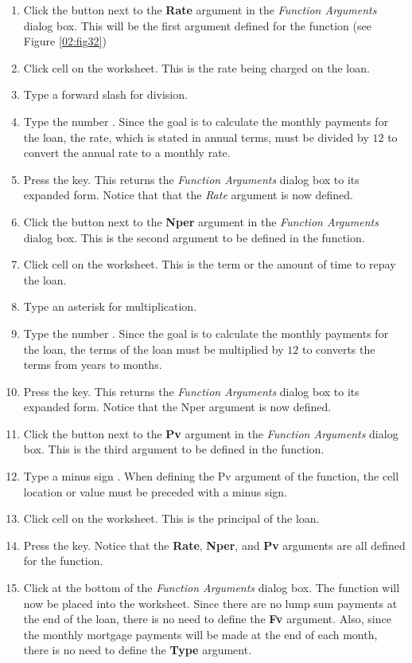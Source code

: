 \begin{enumerate}[resume]
	\item Click the  button next to the \textbf{Rate} argument in the \textit{Function Arguments} dialog box. This will be the first argument defined for the function (see Figure \ref{02:fig32})
	\item Click cell  on the worksheet. This is the rate being charged on the loan.
	\item Type a forward slash \fmtTyping{/} for division.
	\item Type the number . Since the goal is to calculate the monthly payments for the loan, the rate, which is stated in annual terms, must be divided by $ 12 $ to convert the annual rate to a monthly rate.
	\item Press the  key. This returns the \textit{Function Arguments} dialog box to its expanded form. Notice that that the \textit{Rate} argument is now defined.
	\item Click the  button next to the \textbf{Nper} argument in the \textit{Function Arguments} dialog box. This is the second argument to be defined in the function.
	\item Click cell  on the worksheet. This is the term or the amount of time to repay the loan.
	\item Type an asterisk \fmtTyping{*} for multiplication.
	\item Type the number . Since the goal is to calculate the monthly payments for the loan, the terms of the loan must be multiplied by $ 12 $ to converts the terms from years to months.
	\item Press the  key. This returns the \textit{Function Arguments} dialog box to its expanded form. Notice that the Nper argument is now defined.
	\item Click the  button next to the \textbf{Pv} argument in the \textit{Function Arguments} dialog box. This is the third argument to be defined in the function.
	\item Type a minus sign \fmtTyping{-}. When defining the Pv argument of the  function, the cell location or value must be preceded with a minus sign.
	\item Click cell  on the worksheet. This is the principal of the loan.
	\item Press the  key. Notice that the \textbf{Rate}, \textbf{Nper}, and \textbf{Pv} arguments are all defined for the function.
	\item Click  at the bottom of the \textit{Function Arguments} dialog box. The function will now be placed into the worksheet. Since there are no lump sum payments at the end of the loan, there is no need to define the \textbf{Fv} argument. Also, since the monthly mortgage payments will be made at the end of each month, there is no need to define the \textbf{Type} argument.
\end{enumerate}

